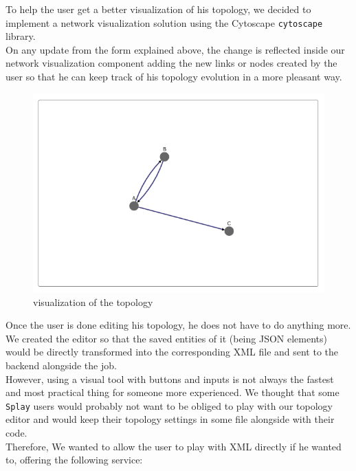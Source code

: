 \documentclass{eplmastersthesis}
\begin{document}
        To help the user get a better visualization of his topology, we
        decided to implement a network visualization solution using the
        Cytoscape \texttt{cytoscape} library.\\
        On any update from the form explained above, the change is reflected
        inside our network visualization component adding the new links or
        nodes created by the user so that he can keep track of his topology
        evolution in a more pleasant way.\\

        \begin{figure}[H]
          \centering
          \includegraphics[scale=0.6]{figures/visual_topology.png}
          \caption{\label{visual_topology} visualization of the topology}
        \end{figure}

        Once the user is done editing his topology, he does not have to
        do anything more. We created the editor so that the saved entities
        of it (being JSON elements) would be directly transformed into the
        corresponding XML file and sent to the backend alongside the
        job.\\

        However, using a visual tool with buttons and inputs is not always
        the fastest and most practical thing for someone more experienced. We
        thought that some \texttt{Splay} users would probably not want to be obliged
        to play with our topology editor and would keep their topology
        settings in some file alongside with their code.\\
        Therefore, We wanted to allow the user to play with XML directly
        if he wanted to, offering the following service:
\end{document}

